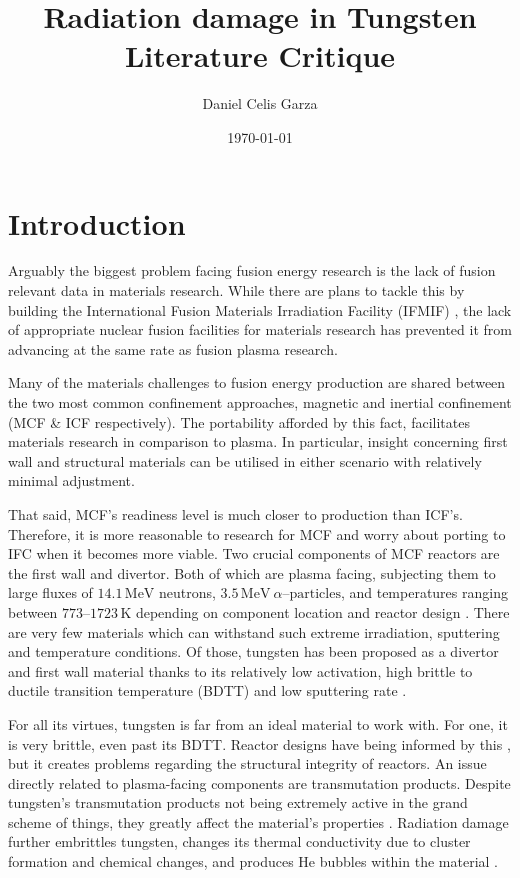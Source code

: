 \documentclass[12pt, a4paper]{article}
\title{Radiation damage in Tungsten Literature Critique}
\author{Daniel Celis Garza}
\date{\today}
\begin{document}
	\maketitle
	\section{Introduction}\label{s:intro}
		Arguably the biggest problem facing fusion energy research is the lack of fusion relevant data in materials research. While there are plans to tackle this by building the International Fusion Materials Irradiation Facility (IFMIF) \cite{ifmif}, the lack of appropriate nuclear fusion facilities for materials research has prevented it from advancing at the same rate as fusion plasma research.
		
		Many of the materials challenges to fusion energy production are shared between the two most common confinement approaches, magnetic and inertial confinement (MCF \& ICF respectively). The portability afforded by this fact, facilitates materials research in comparison to plasma. In particular, insight concerning first wall and structural materials can be utilised in either scenario with relatively minimal adjustment.
		
		That said, MCF's readiness level is much closer to production than ICF's. Therefore, it is more reasonable to research for MCF and worry about porting to IFC when it becomes more viable. Two crucial components of MCF reactors are the first wall and divertor. Both of which are plasma facing, subjecting them to large fluxes of $14.1\, \textrm{MeV}$ neutrons, $3.5\, \textrm{MeV}~\alpha\textrm{--particles}$, and temperatures ranging between $773\textrm{--}1723 \, \textrm{K}$ depending on component location and reactor design \cite{litrev}. There are very few materials which can withstand such extreme irradiation, sputtering and temperature conditions. Of those, tungsten has been proposed as a divertor and first wall material thanks to its relatively low activation, high brittle to ductile transition temperature (BDTT) and low sputtering rate \cite{wdivwall}.
		
		For all its virtues, tungsten is far from an ideal material to work with. For one, it is very brittle, even past its BDTT. Reactor designs have being informed by this \cite{bdtt}, but it creates problems regarding the structural integrity of reactors. An issue directly related to plasma-facing components are transmutation products. Despite tungsten's transmutation products not being extremely active in the grand scheme of things, they greatly affect the material's properties \cite{transmute}. Radiation damage further embrittles tungsten, changes its thermal conductivity due to cluster formation and chemical changes, and produces He bubbles within the material \cite{nirrprop,nirpropmic,helium,ionirrprop,ionirrprop2,ionirrmic,hardening}.
		
\end{document}
